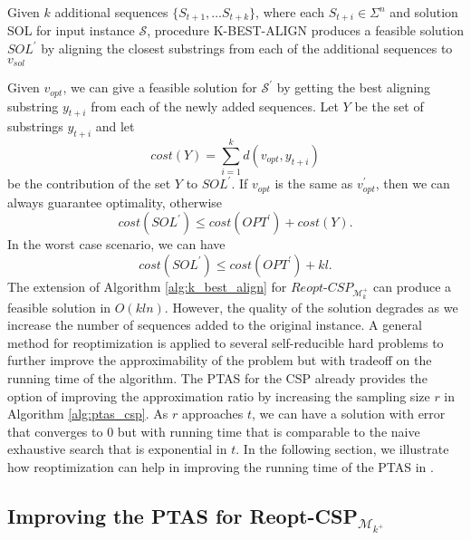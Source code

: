 \documentclass[journal]{acm_proc_article-sp}
\begin{document}
\begin{algorithm} 
\caption{Given $k$ additional sequences $\{S_{t+1}, \ldots S_{t+k}\}$, where each $ S_{t+i} \in \Sigma^n$ and solution SOL for input instance $\mathcal{S}$, procedure K-BEST-ALIGN produces a feasible solution $SOL^\prime$ by aligning the closest substrings from each of the additional sequences to $v_{sol}$}\label{alg:k_best_align}
\begin{algorithmic}[1]
\EndIf
\EndFor
\EndFor
{}
\EndProcedure
\end{algorithmic}
\end{algorithm}

Given $v_{opt}$, we can give a feasible solution for $\mathcal{S}^\prime$ by getting the best aligning substring $y_{t+i}$ from each of the newly added sequences. Let $Y$ be the set of substrings $y_{t+i}$ and let 
$$cost(Y) = \sum\limits_{i=1}^k d(v_{opt}, y_{t+i})$$
be the contribution of the set $Y$ to $SOL^\prime$. If $v_{opt}$ is the same as $v^\prime_{opt}$, then we can always guarantee optimality, otherwise
$$cost(SOL^\prime) \leq cost(OPT^\prime) + cost(Y).$$
In the worst case scenario, we can have
$$cost(SOL^\prime) \leq cost(OPT^\prime) +kl.$$
The extension of Algorithm \ref{alg:k_best_align} for $Reopt$-$CSP_{\mathcal{M}_k^+}$ can produce a feasible solution in $O(kln)$. However, the quality of the solution degrades as we increase the number of sequences added to the original instance. A general method for reoptimization is applied to several self-reducible hard problems to further improve the approximability of the problem but with tradeoff on the running time of the algorithm. The PTAS for the CSP already provides the option of improving the approximation ratio by increasing  the sampling size $r$ in Algorithm \ref{alg:ptas_csp}. As $r$ approaches $t$,  we can have a solution with error that converges to $0$ but with running time that is comparable to the naive exhaustive search that is exponential in $t$. In the following section, we illustrate how reoptimization can help in improving the running time of the PTAS in \cite{Li1999}.

\subsection{Improving the PTAS for Reopt-CSP$_{\mathcal{M}_{k^+}}$}
\end{document}

